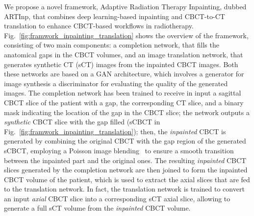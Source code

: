 We propose a novel framework, Adaptive Radiation Therapy Inpainting, dubbed ARTInp, that combines deep learning-based inpainting and CBCT-to-CT translation to enhance CBCT-based workflows in radiotherapy. 
Fig.~\ref{fig:framwork_inpainting_translation} shows the overview of the framework, consisting of two main components: a completion network, that fills the anatomical gaps in the CBCT volumes, and an image translation network, that generates synthetic CT (sCT) images from the inpainted CBCT images.
Both these networks are based on a GAN architecture, which involves a generator for image synthesis a discriminator for evaluating the quality of the generated images.
The completion network has been trained to receive in input a sagittal CBCT slice of the patient with a gap, the corresponding CT slice, and a binary mask indicating the location of the gap in the CBCT slice; the network outputs a \emph{synthetic} CBCT slice with the gap filled (sCBCT in Fig.~\ref{fig:framwork_inpainting_translation}); then, the \emph{inpainted} CBCT is generated by combining the original CBCT with the gap region of 
the generated sCBCT, employing a Poisson image blending~\cite{10.1145/882262.882269} to ensure a smooth transition between the inpainted part and the original ones.
The resulting \emph{inpainted} CBCT slices generated by the completion network are then joined to form the inpainted CBCT volume of the patient, which is used to extract the axial slices that are fed to the translation network.
In fact, the translation network is trained to convert an input \emph{axial} CBCT slice into a corresponding sCT axial slice, allowing to generate a full sCT volume from the \emph{inpainted} CBCT volume. 


